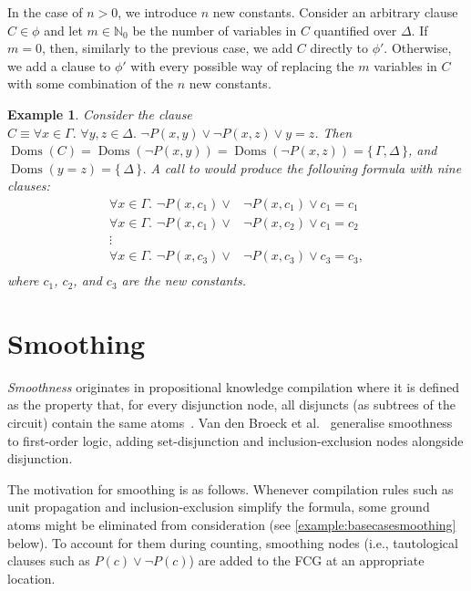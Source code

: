 \documentclass{article}
\newtheorem{example}{Example}
\theoremstyle{remark}
\DeclareMathOperator{\Doms}{Doms}
\begin{document}
In the case of $n>0$, we introduce $n$ new constants. Consider an arbitrary
clause $C \in \phi$ and let $m \in \mathbb{N}_{0}$ be the number of variables in
$C$ quantified over $\Delta$. If $m=0$, then, similarly to the previous case, we
add $C$ directly to $\phi'$. Otherwise, we add a clause to $\phi'$ with every
possible way of replacing the $m$ variables in $C$ with some combination of the
$n$ new constants.

\begin{example}
  Consider the clause $C \equiv \forall x \in \Gamma\text{.
  }\forall y, z \in \Delta\text{. } \neg P(x, y) \lor \neg P(x, z) \lor y=z$.
  Then
  $\Doms(C) = \Doms(\neg P(x, y)) = \Doms(\neg P(x, z)) = \{\, \Gamma, \Delta \,\}$,
  and $\Doms(y=z) = \{\, \Delta \,\}$. A call to  would produce the following formula with nine clauses:
  \begin{align*}
    \forall x \in \Gamma\text{. }\neg P(x, c_{1}) \lor& \neg P(x, c_{1}) \lor c_{1}=c_{1}\\
    \forall x \in \Gamma\text{. }\neg P(x, c_{1}) \lor& \neg P(x, c_{2}) \lor c_{1}=c_{2}\\
    \vdots&\\
    \forall x \in \Gamma\text{. }\neg P(x, c_{3}) \lor& \neg P(x, c_{3}) \lor c_{3}=c_{3},\\
  \end{align*}
  where $c_{1}$, $c_{2}$, and $c_{3}$ are the new constants.
\end{example}

\section{Smoothing}\label{sec:smoothing}

\emph{Smoothness} originates in propositional knowledge compilation where it is
defined as the property that, for every disjunction node, all disjuncts (as
subtrees of the circuit) contain the same atoms~\cite{darwiche2001tractable}.
Van den Broeck et al.~ generalise
smoothness to first-order logic, adding set-disjunction and inclusion-exclusion
nodes alongside disjunction.

The motivation for smoothing is as follows. Whenever compilation rules such as
unit propagation and inclusion-exclusion simplify the formula, some ground atoms
might be eliminated from consideration (see \cref{example:basecasesmoothing}
below). To account for them during counting, smoothing nodes (i.e., tautological
clauses such as $P(c) \lor \neg P(c)$) are added to the FCG at an appropriate
location.
\end{document}
